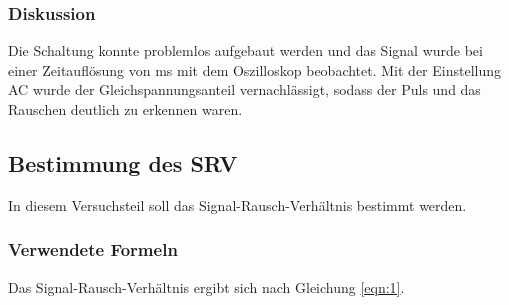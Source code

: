 \documentclass[12pt,a4paper]{article}
\begin{document}
\subsubsection*{Diskussion}
Die Schaltung konnte problemlos aufgebaut werden und das Signal wurde bei einer Zeitauflösung von \unit[500]{ms} mit dem Oszilloskop beobachtet. Mit der Einstellung AC wurde der Gleichspannungsanteil vernachlässigt, sodass der Puls und das Rauschen deutlich zu erkennen waren.
\subsection{Bestimmung des SRV}

In diesem Versuchsteil soll das Signal-Rausch-Verhältnis bestimmt werden.

\subsubsection*{Verwendete Formeln}

Das Signal-Rausch-Verhältnis ergibt sich nach Gleichung \ref{eqn:1}.
\end{document}
